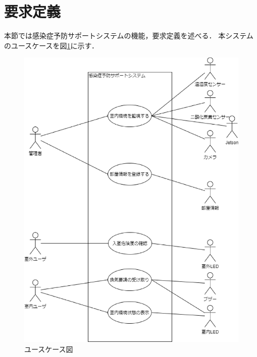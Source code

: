 

\section{要求定義}

本節では感染症予防サポートシステムの機能，要求定義を述べる．
本システムのユースケースを図\ref{usecase}に示す．

\begin{figure}[htbp]
\centering
\includegraphics[width = 15cm]{./picture/usecase_3.eps}
\caption{ユースケース図}
\label{usecase}
\end{figure}

